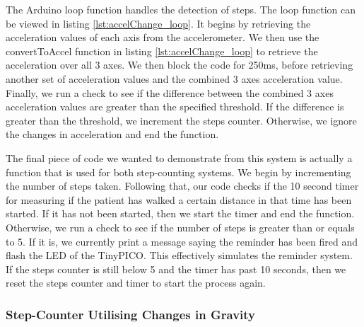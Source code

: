 {

The Arduino loop function handles the detection of steps. The loop function can be viewed in listing \ref{lst:accelChange_loop}. It begins by retrieving the acceleration values of each axis from the accelerometer. We then use the convertToAccel function in listing \ref{lst:accelChange_loop} to retrieve the acceleration over all 3 axes. We then block the code for 250ms, before retrieving another set of acceleration values and the combined 3 axes acceleration value. Finally, we run a check to see if the difference between the combined 3 axes acceleration values are greater than the specified threshold. If the difference is greater than the threshold, we increment the steps counter. Otherwise, we ignore the changes in acceleration and end the function.



The final piece of code we wanted to demonstrate from this system is actually a function that is used for both step-counting systems. We begin by incrementing the number of steps taken. Following that, our code checks if the 10 second timer for measuring if the patient has walked a certain distance in that time has been started. If it has not been started, then we start the timer and end the function. Otherwise, we run a check to see if the number of steps is greater than or equals to 5. If it is, we currently print a message saying the reminder has been fired and flash the LED of the TinyPICO. This effectively simulates the reminder system. If the steps counter is still below 5 and the timer has past 10 seconds, then we reset the steps counter and timer to start the process again.




\subsubsection{Step-Counter Utilising Changes in Gravity}

}
